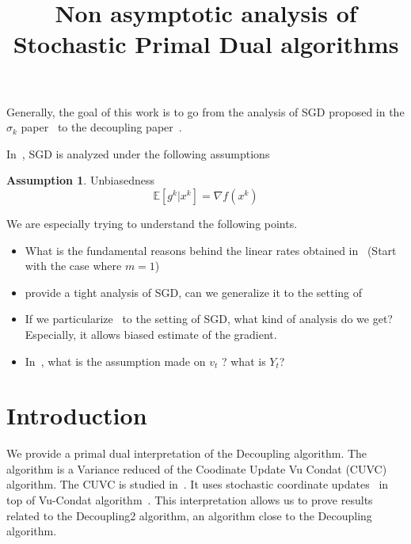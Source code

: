\documentclass{article}
\title{Non asymptotic analysis of Stochastic Primal Dual algorithms}
\newcommand{\bE}{{\mathbb E}}
\theoremstyle{definition}
\newtheorem{assumption}{Assumption}
\begin{document}
\maketitle

\begin{abstract} 
\end{abstract}




Generally, the goal of this work is to go from the analysis of SGD proposed in the $\sigma_k$ paper~\cite{gorbunov2019unified} to the decoupling paper~\cite{mishchenko2019stochastic}.

In~\cite{gorbunov2019unified}, SGD is analyzed under the following assumptions 
\begin{assumption}
Unbiasedness
\begin{equation}
    \bE[g^k|x^k] = \nabla f(x^k)
\end{equation}
\end{assumption}

We are especially trying to understand the following points.
\begin{itemize}
    \item What is the fundamental reasons behind the linear rates obtained in~\cite{mishchenko2019stochastic} (Start with the case where $m=1$)
    \item \cite{gorbunov2019unified} provide a tight analysis of SGD, can we generalize it to the setting of~\cite{mishchenko2019stochastic}
    \item If we particularize~\cite{mishchenko2019stochastic} to the setting of SGD, what kind of analysis do we get? Especially, it allows biased estimate of the gradient.
    \item In~\cite{mishchenko2019stochastic}, what is the assumption made on $v_t$ ? what is $Y_t$?
\end{itemize}

\section{Introduction}

We provide a primal dual interpretation of the Decoupling algorithm. The algorithm is a Variance reduced of the Coodinate Update Vu Condat (CUVC) algorithm. The CUVC is studied in~\cite{Fercoq,Yin}. It uses stochastic coordinate updates~\cite{Iutzeler, Yin, Pesquet Combettes} in top of Vu-Condat algorithm~\cite{Vu, Condat, Chambolle-Pock}.
This interpretation allows us to prove results related to the Decoupling2 algorithm, an algorithm close to the Decoupling algorithm.
\end{document}
